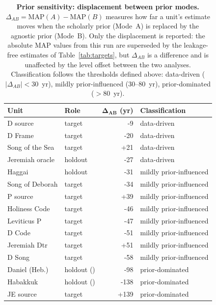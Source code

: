 \begin{table}[!ht]
\centering
\caption{\textbf{Prior sensitivity: displacement between prior modes.}
$\Delta_{AB} = \text{MAP}(A) - \text{MAP}(B)$ measures how far a unit's
estimate moves when the scholarly prior (Mode~A) is replaced by the agnostic
prior (Mode~B).  Only the displacement is reported: the absolute MAP values
from this run are superseded by the leakage-free estimates of
Table~\ref{tab:targets}, but $\Delta_{AB}$ is a difference and is unaffected
by the level offset between the two analyses.  Classification follows the
thresholds defined above: data-driven ($|\Delta_{AB}| < 30$~yr), mildly
prior-influenced (30--80~yr), prior-dominated ($>80$~yr).}
\begin{tabular}{llrl}
\hline
\textbf{Unit} & \textbf{Role} & $\mathbf{\Delta_{AB}}$ \textbf{(yr)} & \textbf{Classification} \\
\hline
D source            & target            & -9 & data-driven \\
D Frame             & target            & -20 & data-driven \\
Song of the Sea     & target            & +21 & data-driven \\
Jeremiah oracle     & holdout           & -27 & data-driven \\
Haggai              & holdout           & -31 & mildly prior-influenced \\
Song of Deborah     & target            & -34 & mildly prior-influenced \\
P source            & target            & +39 & mildly prior-influenced \\
Holiness Code       & target            & -46 & mildly prior-influenced \\
Leviticus P         & target            & -47 & mildly prior-influenced \\
D Code              & target            & -51 & mildly prior-influenced \\
Jeremiah Dtr        & target            & +51 & mildly prior-influenced \\
D Song              & target            & -58 & mildly prior-influenced \\
Daniel (Heb.)       & holdout (\hbvi{}) & -98 & prior-dominated \\
Habakkuk            & holdout (\hbvi{}) & -138 & prior-dominated \\
JE source           & target            & +139 & prior-dominated \\
\hline
\end{tabular}
\label{tab:subsources}
\end{table}
